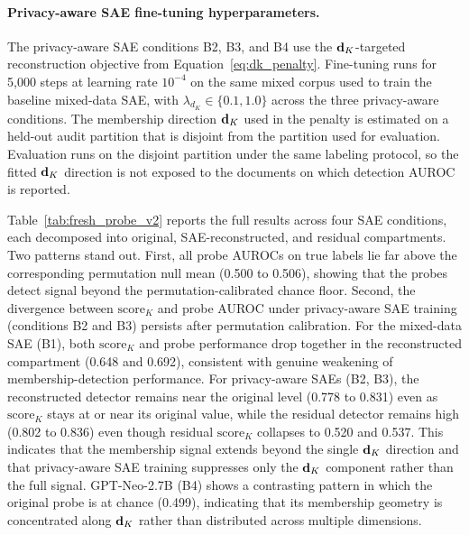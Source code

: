 \paragraph{Privacy-aware SAE fine-tuning hyperparameters.}
The privacy-aware SAE conditions B2, B3, and B4 use the $\mathbf{d}_K$-targeted reconstruction objective from Equation~\ref{eq:dk_penalty}. Fine-tuning runs for 5{,}000 steps at learning rate $10^{-4}$ on the same mixed corpus used to train the baseline mixed-data SAE, with $\lambda_{d_K} \in \{0.1, 1.0\}$ across the three privacy-aware conditions. The membership direction $\mathbf{d}_K$ used in the penalty is estimated on a held-out audit partition that is disjoint from the partition used for evaluation. Evaluation runs on the disjoint partition under the same labeling protocol, so the fitted $\mathbf{d}_K$ direction is not exposed to the documents on which detection AUROC is reported.

Table~\ref{tab:fresh_probe_v2} reports the full results across four SAE conditions, each decomposed into original, SAE-reconstructed, and residual compartments.
Two patterns stand out.
First, all probe AUROCs on true labels lie far above the corresponding permutation null mean (0.500 to 0.506), showing that the probes detect signal beyond the permutation-calibrated chance floor.
Second, the divergence between $\mathrm{score}_K$ and probe AUROC under privacy-aware SAE training (conditions B2 and B3) persists after permutation calibration.
For the mixed-data SAE (B1), both $\mathrm{score}_K$ and probe performance drop together in the reconstructed compartment (0.648 and 0.692), consistent with genuine weakening of membership-detection performance.
For privacy-aware SAEs (B2, B3), the reconstructed detector remains near the original level (0.778 to 0.831) even as $\mathrm{score}_K$ stays at or near its original value, while the residual detector remains high (0.802 to 0.836) even though residual $\mathrm{score}_K$ collapses to 0.520 and 0.537.
This indicates that the membership signal extends beyond the single $\mathbf{d}_K$ direction and that privacy-aware SAE training suppresses only the $\mathbf{d}_K$ component rather than the full signal.
GPT-Neo-2.7B (B4) shows a contrasting pattern in which the original probe is at chance (0.499), indicating that its membership geometry is concentrated along $\mathbf{d}_K$ rather than distributed across multiple dimensions.

